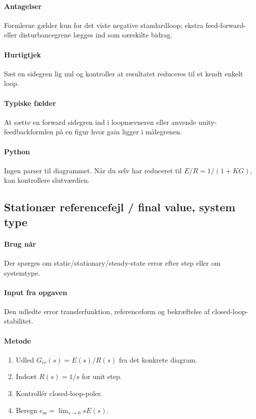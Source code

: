 \paragraph{Antagelser}
Formlerne gælder kun for det viste negative standardloop; ekstra feed-forward- eller
disturbancegrene lægges ind som særskilte bidrag.

\paragraph{Hurtigtjek}
Sæt en sidegren lig nul og kontroller at resultatet reduceres til et kendt enkelt loop.

\paragraph{Typiske fælder}
At sætte en forward sidegren ind i loopnævneren eller anvende unity-feedbackformlen på
en figur hvor gain ligger i målegrenen.

\paragraph{Python}
Ingen parser til diagrammet. Når du selv har reduceret til \(E/R=1/(1+KG)\), kan
 kontrollere slutværdien.

\subsection{Stationær referencefejl / final value, system type}

\paragraph{Brug når}
Der spørges om static/stationary/steady-state error efter step eller om systemtype.

\paragraph{Input fra opgaven}
Den udledte error transferfunktion, referenceform og bekræftelse af closed-loop-stabilitet.

\paragraph{Metode}
\begin{enumerate}
\item Udled \(G_{er}(s)=E(s)/R(s)\) fra det konkrete diagram.
\item Indsæt \(R(s)=1/s\) for unit step.
\item Kontrollér closed-loop-poler.
\item Beregn \(e_{\mathrm{ss}}=\lim_{s\to0}sE(s)\).
\end{enumerate}

